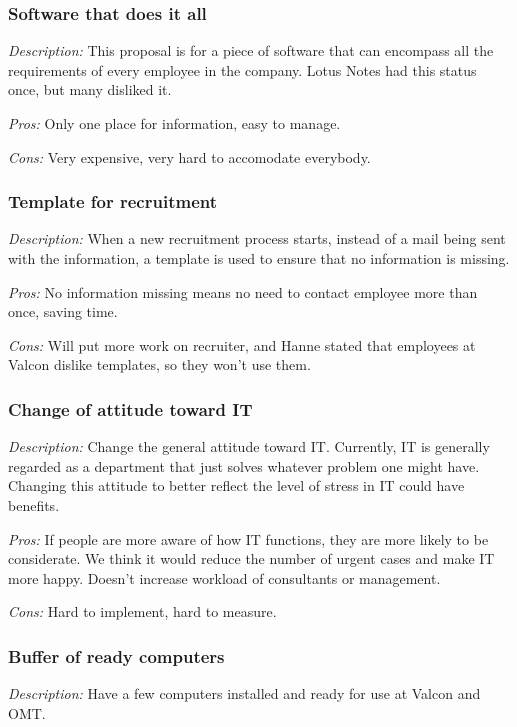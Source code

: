 \subsubsection{Software that does it all}
\emph{Description:} This proposal is for a piece of software that can encompass all the requirements of every employee in the company. Lotus Notes had this status once, but many disliked it.

\noindent \emph{Pros:} Only one place for information, easy to manage.

\noindent \emph{Cons:} Very expensive, very hard to accomodate everybody.

\subsubsection{Template for recruitment}
\emph{Description:} When a new recruitment process starts, instead of a mail being sent with the information, a template is used to ensure that no information is missing.

\noindent \emph{Pros:} No information missing means no need to contact employee more than once, saving time.

\noindent \emph{Cons:} Will put more work on recruiter, and Hanne stated that employees at Valcon dislike templates, so they won't use them.

\subsubsection{Change of attitude toward IT}
\emph{Description:} Change the general attitude toward IT. Currently, IT is generally regarded as a department that just solves whatever problem one might have. Changing this attitude to better reflect the level of stress in IT could have benefits.

\noindent \emph{Pros:} If people are more aware of how IT functions, they are more likely to be considerate. We think it would reduce the number of urgent cases and make IT more happy. Doesn't increase workload of consultants or management.

\noindent \emph{Cons:} Hard to implement, hard to measure.

\subsubsection{Buffer of ready computers}
\emph{Description:} Have a few computers installed and ready for use at Valcon and OMT.

